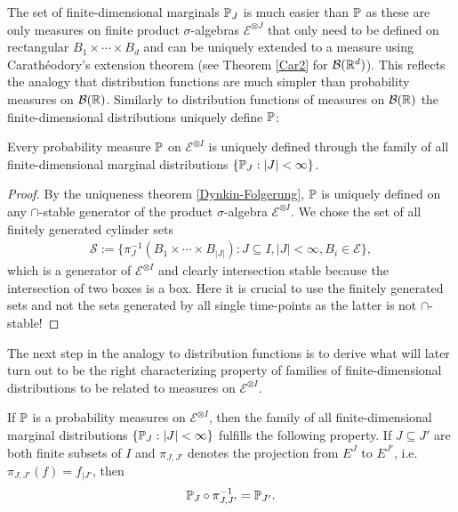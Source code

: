 The set of finite-dimensional marginals $\P_J$ is much easier than $\P$ as these are only measures on finite product $\sigma$-algebras $\mathcal E^{\otimes J}$ that only need to be defined on rectangular $B_1\times \cdots\times B_d$ and can be uniquely extended to a measure using Carath\'eodory's extension theorem (see Theorem \ref{Car2} for $\mathcal B(\R^d)$). This reflects the analogy that distribution functions are much simpler than probability measures on $\mathcal B(\R)$. Similarly to distribution functions of measures on $\mathcal B(\R)$ the finite-dimensional distributions uniquely define $\P$:
\begin{laussagewerkzeug}\label{lemma:unique}
\begin{prop}
	Every probability measure $\P$ on $\mathcal E^{\otimes I}$ is uniquely defined through the family of all finite-dimensional marginal distributions $\{\P_J:|J|<\infty\}$.
\end{prop}
\end{laussagewerkzeug}
\begin{proof}[Proof]
	By the uniqueness theorem \ref{Dynkin-Folgerung}, $\P$ is uniquely defined on any $\cap$-stable generator of the product $\sigma$-algebra $\mathcal E^{\otimes I}$. We chose the set of all finitely generated cylinder sets
	\begin{align*}
		\mathcal S:=\{\pi_J^{-1}(B_1\times \cdots \times B_{|J|}):J \subseteq I, |J|<\infty, B_i\in  \mathcal E\},
	\end{align*}
	which is a generator of $\mathcal E^{\otimes I}$ and clearly intersection stable because the intersection of two boxes is a box. Here it is crucial to use the finitely generated sets and not the sets generated by all single time-points as the latter is not $\cap$-stable!
\end{proof}
The next step in the analogy to distribution functions is to derive what will later turn out to be the right characterizing property of families of finite-dimensional distributions to be related to measures on $\mathcal E^{\otimes I}$. 
\begin{laussagewerkzeug}
	\begin{prop}
	If $\P$ is a probability measures on $\mathcal E^{\otimes I}$, then the family of all finite-dimensional marginal distributions $\{\P_J:|J|<\infty\}$ fulfills the following property. If $J\subseteq J'$ are both finite subsets of $I$ and $\pi_{J,J'}$ denotes the projection from $E^J$ to $E^{J'}$, i.e. $\pi_{J,J'}(f)=f_{|J'}$, then
		\begin{align*}
			\P_J \circ \pi^{-1}_{J,J'}=\P_{J'}.
		\end{align*}
	\end{prop}
\end{laussagewerkzeug}
